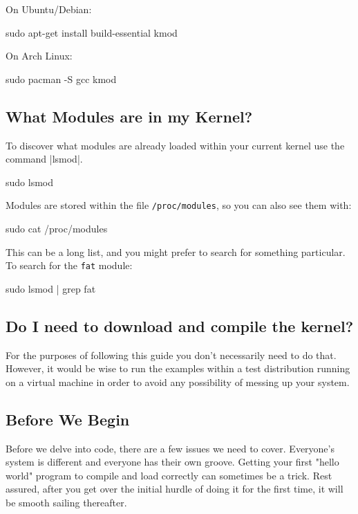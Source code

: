 \documentclass[10pt, oneside]{book}
\begin{document}
On Ubuntu/Debian:
\begin{codebash}
sudo apt-get install build-essential kmod
\end{codebash}

On Arch Linux:
\begin{codebash}
sudo pacman -S gcc kmod
\end{codebash}

\subsection{What Modules are in my Kernel?}
\label{sec:modutils}

To discover what modules are already loaded within your current kernel use the command \sh|lsmod|.
\begin{codebash}
sudo lsmod
\end{codebash}

Modules are stored within the file \verb|/proc/modules|, so you can also see them with:
\begin{codebash}
sudo cat /proc/modules
\end{codebash}

This can be a long list, and you might prefer to search for something particular.
To search for the \verb|fat| module:
\begin{codebash}
sudo lsmod | grep fat
\end{codebash}

\subsection{Do I need to download and compile the kernel?}
\label{sec:buildkernel}
For the purposes of following this guide you don't necessarily need to do that.
However, it would be wise to run the examples within a test distribution running on a virtual machine in order to avoid any possibility of messing up your system.

\subsection{Before We Begin}
\label{sec:preparation}
Before we delve into code, there are a few issues we need to cover.
Everyone's system is different and everyone has their own groove.
Getting your first "hello world" program to compile and load correctly can sometimes be a trick.
Rest assured, after you get over the initial hurdle of doing it for the first time, it will be smooth sailing thereafter.
\end{document}
